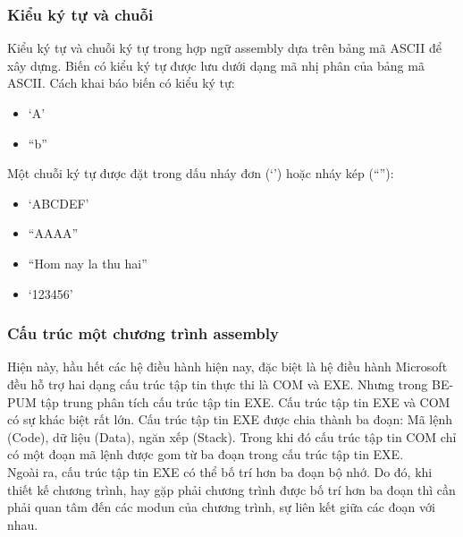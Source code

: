 	\subsubsection*{Kiểu ký tự và chuỗi}
	Kiểu ký tự và chuỗi ký tự trong hợp ngữ assembly dựa trên bảng mã ASCII để xây dựng. Biến có kiểu ký tự được lưu dưới dạng mã nhị phân của bảng mã ASCII. 
	Cách khai báo biến có kiểu ký tự:
	\begin{itemize}
		\item	‘A’ 
		\item	“b” 
	\end{itemize}
	Một chuỗi ký tự được đặt trong dấu nháy đơn (‘’)  hoặc nháy kép (“”):
	\begin{itemize}		
		 \item  ‘ABCDEF’
		\item	“AAAA”
		\item	“Hom nay la thu hai”
		\item	‘123456’ 
	\end{itemize}	
		
		\newpage
		\subsubsection{Cấu trúc một chương trình assembly}
			Hiện này, hầu hết các hệ điều hành hiện nay, đặc biệt là hệ điều hành Microsoft đều hỗ trợ hai dạng cấu trúc tập tin thực thi là COM và EXE. Nhưng trong BE-PUM tập trung phân tích cấu trúc tập tin EXE. Cấu trúc tập tin EXE và COM có sự khác biệt rất lớn. Cấu trúc tập tin EXE được chia thành ba đoạn: Mã lệnh (Code), dữ liệu (Data), ngăn xếp (Stack). Trong khi đó cấu trúc tập tin COM chỉ có một đoạn mã lệnh được gom từ ba đoạn trong cấu trúc tập tin EXE. \\

Ngoài ra, cấu trúc tập tin EXE có thể bố trí hơn ba đoạn bộ nhớ. Do đó, khi thiết kế chương trình, hay gặp phải chương trình được bố trí hơn ba đoạn thì cần phải quan tâm đến các modun của chương trình, sự liên kết giữa các đoạn với nhau. \\

